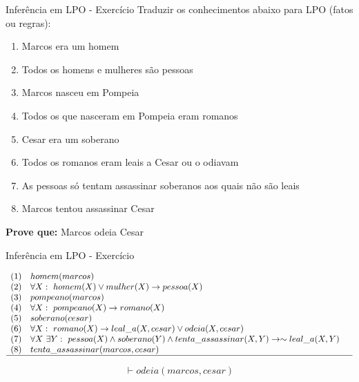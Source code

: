 \begin{frame}[t]{Inferência em LPO - Exercício}	
	Traduzir os conhecimentos abaixo para LPO (fatos ou regras):

	\begin{enumerate}
	\item Marcos era um homem
	\item Todos os homens e mulheres são pessoas
	\item Marcos nasceu em Pompeia
	\item Todos os que nasceram em Pompeia eram romanos
	\item Cesar era um soberano
	\item Todos os romanos eram leais a Cesar ou o odiavam
	\item As pessoas só tentam assassinar soberanos aos quais não são leais
	\item Marcos tentou assassinar Cesar
	\end{enumerate}

	\vskip 0.5cm

	{\bf Prove que:} Marcos odeia Cesar 
\end{frame}


\begin{frame}[t]{Inferência em LPO - Exercício}
	\begin{tiny}	
	$$\begin{array}{lll}
	(1) & homem(marcos) & \\
	(2) & \forall X: ~homem(X) \vee mulher(X) \rightarrow pessoa(X) & \\
	(3) & pompeano(marcos) & \\
	(4) & \forall X: ~pompeano(X) \rightarrow romano(X) & \\
	(5) & soberano(cesar) & \\
	(6) & \forall X:~romano(X) \rightarrow leal\_a(X, cesar) \vee odeia(X, cesar) & \\
	(7) & \forall X~\exists Y:~ pessoa(X) \wedge soberano(Y) \wedge tenta\_assassinar(X,Y) \rightarrow \sim leal\_a(X,Y) & \\
	(8) & tenta\_assassinar(marcos, cesar) & \\
	\hline
	\end{array}$$	
	\end{tiny}

	$$\vdash odeia(marcos, cesar)$$
\end{frame}


